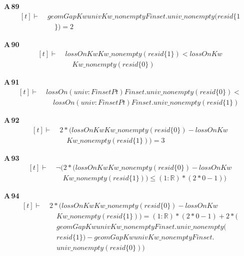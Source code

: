 \noindent\textbf{A\,89}\quad{}
{\footnotesize\[ \begin{aligned}[t]
\vdash\;&\mathit{geomGap} \mathit{Kw} \mathit{univ} \mathit{Kw\_nonempty} \mathit{Finset}.\mathit{univ\_nonempty} (\mathit{resid} \{ 1\\
&\quad \} ) = 2
\end{aligned} \]}

\noindent\textbf{A\,90}\quad{}
{\footnotesize\[ \begin{aligned}[t]
\vdash\;&\mathit{lossOn} \mathit{Kw} \mathit{Kw\_nonempty} (\mathit{resid} \{ 1\} ) < \mathit{lossOn} \mathit{Kw}\\
&\quad \mathit{Kw\_nonempty} (\mathit{resid} \{ 0\} )
\end{aligned} \]}

\noindent\textbf{A\,91}\quad{}
{\footnotesize\[ \begin{aligned}[t]
\vdash\;&\mathit{lossOn} (\mathit{univ} : \mathit{Finset} \mathit{Pt}) \mathit{Finset}.\mathit{univ\_nonempty} (\mathit{resid} \{ 0\} ) <\\
&\quad \mathit{lossOn} (\mathit{univ} : \mathit{Finset} \mathit{Pt}) \mathit{Finset}.\mathit{univ\_nonempty} (\mathit{resid} \{ 1\} )
\end{aligned} \]}

\noindent\textbf{A\,92}\quad{}
{\footnotesize\[ \begin{aligned}[t]
\vdash\;&2 * (\mathit{lossOn} \mathit{Kw} \mathit{Kw\_nonempty} (\mathit{resid} \{ 0\} ) - \mathit{lossOn} \mathit{Kw}\\
&\quad \mathit{Kw\_nonempty} (\mathit{resid} \{ 1\} )) = 3
\end{aligned} \]}

\noindent\textbf{A\,93}\quad{}
{\footnotesize\[ \begin{aligned}[t]
\vdash\;&\neg (2 * (\mathit{lossOn} \mathit{Kw} \mathit{Kw\_nonempty} (\mathit{resid} \{ 0\} ) - \mathit{lossOn} \mathit{Kw}\\
&\quad \mathit{Kw\_nonempty} (\mathit{resid} \{ 1\} )) \leq (1 : \mathbb{R} ) * (2 * 0 - 1))
\end{aligned} \]}

\noindent\textbf{A\,94}\quad{}
{\footnotesize\[ \begin{aligned}[t]
\vdash\;&2 * (\mathit{lossOn} \mathit{Kw} \mathit{Kw\_nonempty} (\mathit{resid} \{ 0\} ) - \mathit{lossOn} \mathit{Kw}\\
&\quad \mathit{Kw\_nonempty} (\mathit{resid} \{ 1\} )) = (1 : \mathbb{R} ) * (2 * 0 - 1) + 2 * (\\
&\quad \mathit{geomGap} \mathit{Kw} \mathit{univ} \mathit{Kw\_nonempty} \mathit{Finset}.\mathit{univ\_nonempty} (\\
&\quad \mathit{resid} \{ 1\} ) - \mathit{geomGap} \mathit{Kw} \mathit{univ} \mathit{Kw\_nonempty} \mathit{Finset}.\\
&\quad \mathit{univ\_nonempty} (\mathit{resid} \{ 0\} ))
\end{aligned} \]}

